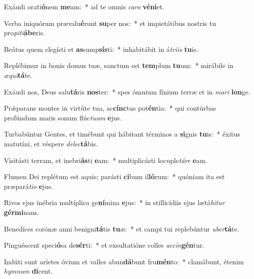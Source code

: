 \item Exáudi orati\textbf{ó}nem \textbf{me}am:~* ad te omnis \textit{ca}\textit{ro} \textbf{vé}\textbf{ni}et.
\item Verba iniquórum prævalu\textbf{é}runt \textbf{su}per nos:~* et impietátibus nostris tu pro\textit{pi}\textit{ti}\textbf{á}\textbf{be}ris.
\item Beátus quem elegísti et \textbf{as}sump\textbf{sís}ti:~* inhabitábit in á\textit{tri}\textit{is} \textbf{tu}is.
\item Replébimur in bonis domus tuæ, sanctum est \textbf{tem}plum \textbf{tu}um:~* mirábile in \textit{æ}\textit{qui}\textbf{tá}te.
\item Exáudi nos, Deus salu\textbf{tá}ris \textbf{nos}ter:~* spes ómnium fínium terræ et in \textit{ma}\textit{ri} \textbf{lon}ge.
\item Prǽparans montes in virtúte tua, ac\textbf{cínc}tus pot\textbf{én}tia:~* qui contúrbas profúndum maris sonum flúc\textit{tu}\textit{um} \textbf{e}jus.
\item Turbabúntur Gentes, et timébunt qui hábitant términos a \textbf{si}gnis \textbf{tu}is:~* éxitus matutíni, et véspere \textit{de}\textit{lec}\textbf{tá}bis.
\item Visitásti terram, et inebri\textbf{ás}ti \textbf{e}am:~* multiplicásti locuple\textit{tá}\textit{re} \textbf{e}am.
\item Flumen Dei replétum est aquis; parásti \textbf{ci}bum il\textbf{ló}rum:~* quóniam ita est præpará\textit{ti}\textit{o} \textbf{e}jus.
\item Rivos ejus inébria multíplica ge\textbf{ní}mina \textbf{e}jus:~* in stillicídiis ejus lætá\textit{bi}\textit{tur} \textbf{gér}\textbf{mi}nans.
\item Benedíces corónæ anni benigni\textbf{tá}tis \textbf{tu}æ:~* et campi tui replebúntur \textit{u}\textit{ber}\textbf{tá}te.
\item Pinguéscent speci\textbf{ó}sa de\textbf{sér}ti:~* et exsultatióne colles \textit{ac}\textit{cin}\textbf{gén}tur.
\item Indúti sunt aríetes óvium et valles abun\textbf{dá}bunt fru\textbf{mén}to:~* clamábunt, étenim \textit{hym}\textit{num} \textbf{di}cent.
